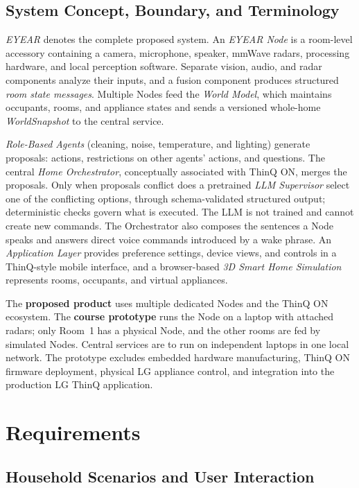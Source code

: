 \documentclass[conference]{IEEEtran}
\begin{document}
\subsection{System Concept, Boundary, and Terminology}

\emph{EYEAR} denotes the complete proposed system.
An \emph{EYEAR Node} is a room-level accessory containing a camera,
microphone, speaker, mmWave radars, processing hardware, and local
perception software. Separate vision, audio, and radar components
analyze their inputs, and a fusion component produces structured
\emph{room state messages}. Multiple Nodes feed the
\emph{World Model}, which maintains occupants, rooms, and appliance
states and sends a versioned whole-home \emph{WorldSnapshot} to the
central service.

\emph{Role-Based Agents} (cleaning, noise, temperature, and
lighting) generate proposals: actions, restrictions on other
agents' actions, and questions. The central \emph{Home
Orchestrator}, conceptually associated with ThinQ ON, merges the
proposals. Only when proposals conflict does a pretrained
\emph{LLM Supervisor} select one of the conflicting options, through
schema-validated structured output; deterministic checks govern
what is executed. The LLM is not trained and cannot create new
commands. The Orchestrator also composes the sentences a Node
speaks and answers direct voice commands introduced by a wake
phrase. An \emph{Application Layer} provides preference settings,
device views, and controls in a ThinQ-style mobile interface, and
a browser-based \emph{3D Smart Home Simulation} represents rooms,
occupants, and virtual appliances.

The \textbf{proposed product} uses multiple dedicated Nodes and
the ThinQ ON ecosystem. The \textbf{course prototype} runs the
Node on a laptop with attached radars; only Room~1 has a physical
Node, and the other rooms are fed by simulated Nodes. Central
services are to run on independent laptops in one local network. The
prototype excludes embedded hardware manufacturing, ThinQ ON
firmware deployment, physical LG appliance control, and
integration into the production LG ThinQ application.

\section{Requirements}

\subsection{Household Scenarios and User Interaction}
\end{document}
